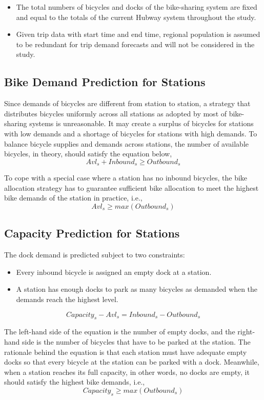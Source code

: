 \documentclass[journal, letterpaper]{IEEEtran}
\begin{document}
\begin{itemize}
\item The total numbers of bicycles and docks of the bike-sharing system are fixed and equal to the totals of the current Hubway system throughout the study.
\item Given trip data with start time and end time, regional population is assumed to be redundant for trip demand forecasts and will not be considered in the study.
\end{itemize} 
\subsection{Bike Demand Prediction for Stations}
Since demands of bicycles are different from station to station, a strategy that distributes bicycles uniformly across all stations as adopted by most of bike-sharing systems is unreasonable. It may create a surplus of bicycles for stations with low demands and a shortage of bicycles for stations with high demands. To balance bicycle supplies and demands across stations, the number of available bicycles, in theory, should satisfy the equation below,
$$Avl_{s} + Inbound_{s} \ge Outbound_{s}$$

To cope with a special case where a station has no inbound bicycles, the bike allocation strategy has to guarantee sufficient bike allocation to meet the highest bike demands of the station in practice, i.e.,
$$Avl_{s} \ge max(Outbound_{s})$$
\subsection{Capacity Prediction for Stations}
The dock demand is predicted subject to two constraints:
\begin{itemize}
\item Every inbound bicycle is assigned an empty dock at a station.
\item A station has enough docks to park as many bicycles as demanded when the demands reach the highest level.
\end{itemize}

$$Capacity_{s} - Avl_{s} = Inbound_{s} - Outbound_{s}$$

The left-hand side of the equation is the number of empty docks, and the right-hand side is the number of bicycles that have to be parked at the station. The rationale behind the equation is that each station must have adequate empty docks so that every bicycle at the station can be parked with a dock. Meanwhile, when a station reaches its full capacity, in other words, no docks are empty, it should satisfy the highest bike demands, i.e., 
$$Capacity_{s} \ge max(Outbound_{s})$$
\end{document}
